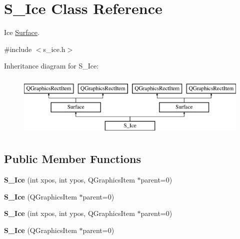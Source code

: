 \hypertarget{class_s___ice}{}\section{S\+\_\+\+Ice Class Reference}
\label{class_s___ice}


Ice \hyperlink{class_surface}{Surface}.  




{\ttfamily \#include $<$s\+\_\+ice.\+h$>$}

Inheritance diagram for S\+\_\+\+Ice\+:\begin{figure}[H]
\begin{center}
\leavevmode
\includegraphics[height=3.000000cm]{class_s___ice}
\end{center}
\end{figure}
\subsection*{Public Member Functions}
\begin{DoxyCompactItemize}
\item 
\hypertarget{class_s___ice_a3a1fdb0204964dfee672629d22cd0e76}{}{\bfseries S\+\_\+\+Ice} (int xpos, int ypos, Q\+Graphics\+Item $\ast$parent=0)\label{class_s___ice_a3a1fdb0204964dfee672629d22cd0e76}

\item 
\hypertarget{class_s___ice_a17b24abf85ec0bd466971675b657f856}{}{\bfseries S\+\_\+\+Ice} (Q\+Graphics\+Item $\ast$parent=0)\label{class_s___ice_a17b24abf85ec0bd466971675b657f856}

\item 
\hypertarget{class_s___ice_a3a1fdb0204964dfee672629d22cd0e76}{}{\bfseries S\+\_\+\+Ice} (int xpos, int ypos, Q\+Graphics\+Item $\ast$parent=0)\label{class_s___ice_a3a1fdb0204964dfee672629d22cd0e76}

\item 
\hypertarget{class_s___ice_a17b24abf85ec0bd466971675b657f856}{}{\bfseries S\+\_\+\+Ice} (Q\+Graphics\+Item $\ast$parent=0)\label{class_s___ice_a17b24abf85ec0bd466971675b657f856}

\end{DoxyCompactItemize}


